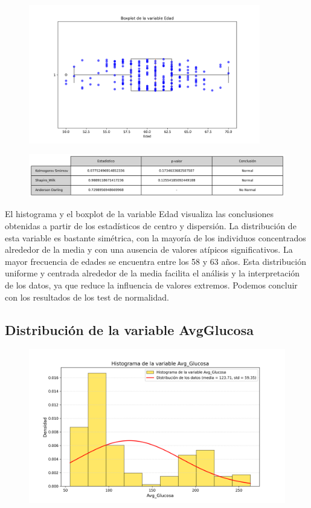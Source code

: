 \documentclass[a4paper, 12pt]{article}
\begin{document}
\vspace {-1cm}
\begin{figure}[H]
    \centering
    \includegraphics[width=0.9\textwidth]{img/Boxplot/Boxplt_Edad.png}
\end{figure}

\begin{figure}[H]
    \centering
    \includegraphics[width=1\textwidth]{img/Tablas/test_normalidad_Edad.png}
\end{figure}


El histograma y el boxplot de la variable Edad visualiza las conclusiones obtenidas a partir de los estadísticos de centro y 
dispersión. La distribución de esta variable es bastante simétrica, con la mayoría de los individuos concentrados alrededor 
de la media y con una ausencia de valores atípicos significativos. La mayor frecuencia de edades se encuentra entre los 58 y 63 años. Esta distribución uniforme y centrada alrededor de la media 
facilita el análisis y la interpretación de los datos, ya que reduce la influencia de valores extremos. Podemos concluir con los resultados de los test de normalidad.


\subsection{Distribución de la variable AvgGlucosa}
\begin{figure}[H]
    \centering
    \includegraphics[width=1\textwidth]{img/Histogramas/Histograma_Avg_Glucosa.png}
\end{figure}
\end{document}
